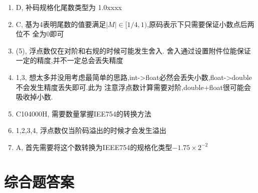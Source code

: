 \documentclass[12pt, a4paper, oneside, UTF8]{ctexbook}
\begin{document}
\begin{enumerate}[label=\arabic*.\textbf{答案}:]
\item D, 补码规格化尾数类型为{\color{red} 1.0xxxx}
\item C, 基为4表明尾数的值要满足$\left| M \right| \in [1/4, 1)$,原码表示下只需要保证小数点后两位不
全为0即可
\item (5), 浮点数仅在对阶和右规的时候可能发生舍入. 舍入通过设置附件位能保证一定的精度,并不一定总会丢失精度 
\item 1,3, 想太多并没用考虑最简单的思路,int->float必然会丢失小数,float->double不会发生精度丢失即可.此为
注意浮点数计算需要对阶,double+float很可能会吸收掉小数. 
\item C104000H, 需要数量掌握IEE754的转换方法 
\item 1,2,3,4, {\color{red} 浮点数仅当阶码溢出的时候才会发生溢出}
\item A, 首先需要将这个数转换为IEEE754的规格化类型$-1.75\times 2^{-2}$
\end{enumerate}
\section{综合题答案}
\ifx\allfiles\undefined
\end{document}
